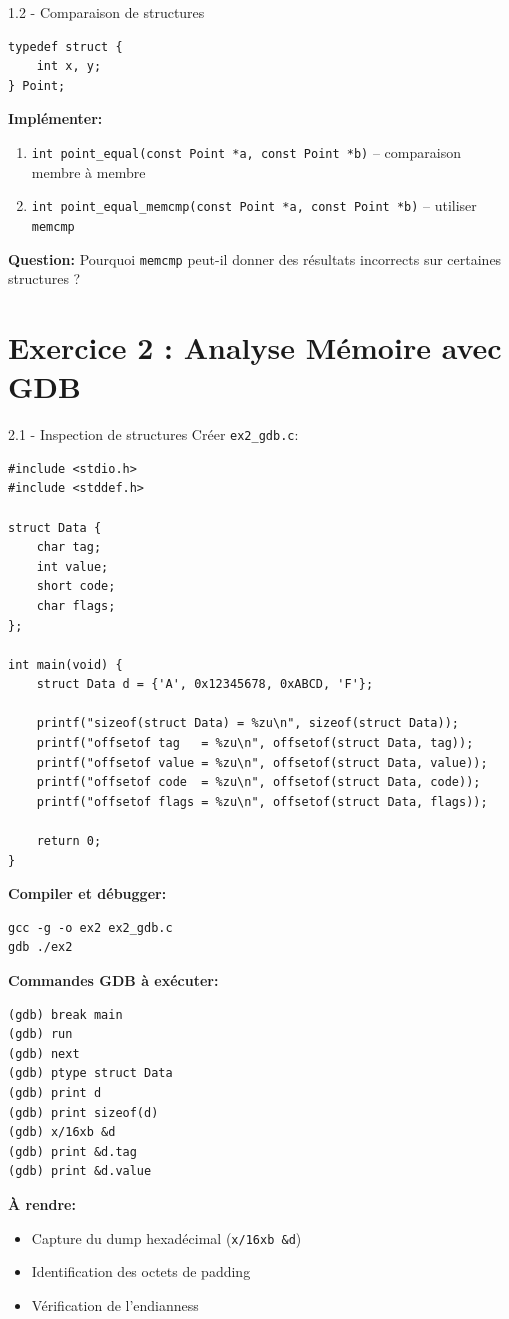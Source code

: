 \documentclass[10pt,a4paper]{article}
\begin{document}
\begin{exercicebox}{1.2 - Comparaison de structures}
\begin{lstlisting}
typedef struct {
    int x, y;
} Point;
\end{lstlisting}

\textbf{Implémenter:}
\begin{enumerate}
\item \texttt{int point\_equal(const Point *a, const Point *b)} -- comparaison membre à membre
\item \texttt{int point\_equal\_memcmp(const Point *a, const Point *b)} -- utiliser \texttt{memcmp}
\end{enumerate}

\textbf{Question:} Pourquoi \texttt{memcmp} peut-il donner des résultats incorrects sur certaines structures ?
\end{exercicebox}

\section{Exercice 2 : Analyse Mémoire avec GDB}

\begin{exercicebox}{2.1 - Inspection de structures}
Créer \texttt{ex2\_gdb.c}:

\begin{lstlisting}
#include <stdio.h>
#include <stddef.h>

struct Data {
    char tag;
    int value;
    short code;
    char flags;
};

int main(void) {
    struct Data d = {'A', 0x12345678, 0xABCD, 'F'};
    
    printf("sizeof(struct Data) = %zu\n", sizeof(struct Data));
    printf("offsetof tag   = %zu\n", offsetof(struct Data, tag));
    printf("offsetof value = %zu\n", offsetof(struct Data, value));
    printf("offsetof code  = %zu\n", offsetof(struct Data, code));
    printf("offsetof flags = %zu\n", offsetof(struct Data, flags));
    
    return 0;
}
\end{lstlisting}

\textbf{Compiler et débugger:}
\begin{verbatim}
gcc -g -o ex2 ex2_gdb.c
gdb ./ex2
\end{verbatim}

\textbf{Commandes GDB à exécuter:}
\begin{verbatim}
(gdb) break main
(gdb) run
(gdb) next
(gdb) ptype struct Data
(gdb) print d
(gdb) print sizeof(d)
(gdb) x/16xb &d
(gdb) print &d.tag
(gdb) print &d.value
\end{verbatim}

\textbf{À rendre:}
\begin{itemize}
\item Capture du dump hexadécimal (\texttt{x/16xb \&d})
\item Identification des octets de padding
\item Vérification de l'endianness
\end{itemize}
\end{exercicebox}
\end{document}
